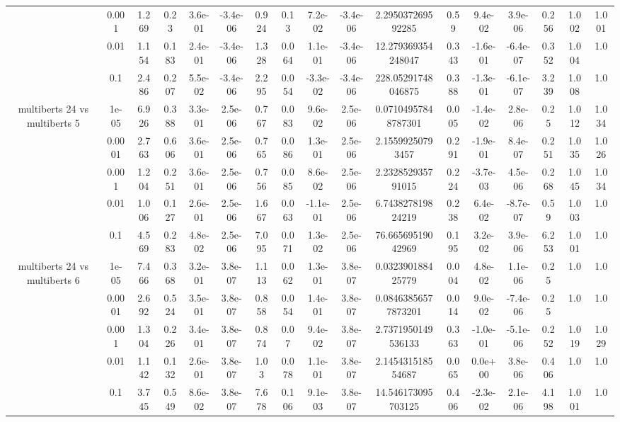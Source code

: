 \begin{tabular}{|c|c|c|c|c|c|c|c|c|c|c|c|c|c|c|c|c|}
 & 0.001 & 1.269 & 0.23 & 3.6e-01 & -3.4e-06 & 0.924 & 0.13 & 7.2e-02 & -3.4e-06 & 2.295037269592285 & 0.59 & 9.4e-02 & 3.9e-06 & 0.256 & 1.002 & 1.001 \\
 & 0.01 & 1.154 & 0.183 & 2.4e-01 & -3.4e-06 & 1.328 & 0.064 & 1.1e-01 & -3.4e-06 & 12.279369354248047 & 0.343 & -1.6e-01 & -6.4e-07 & 0.352 & 1.004 & 1.0 \\
 & 0.1 & 2.486 & 0.207 & 5.5e-02 & -3.4e-06 & 2.295 & 0.054 & -3.3e-02 & -3.4e-06 & 228.05291748046875 & 0.388 & -1.3e-01 & -6.1e-07 & 3.239 & 1.008 & 1.0 \\
\hline
\multirow{5}{*}{multiberts 24 vs multiberts 5} & 1e-05 & 6.926 & 0.388 & 3.3e-01 & 2.5e-06 & 0.767 & 0.083 & 9.6e-02 & 2.5e-06 & 0.07104957848787301 & 0.005 & -1.4e-02 & 2.8e-06 & 0.25 & 1.012 & 1.034 \\
 & 0.0001 & 2.763 & 0.606 & 3.6e-01 & 2.5e-06 & 0.765 & 0.086 & 1.3e-01 & 2.5e-06 & 2.15599250793457 & 0.291 & -1.9e-01 & 8.4e-07 & 0.251 & 1.035 & 1.026 \\
 & 0.001 & 1.204 & 0.251 & 3.6e-01 & 2.5e-06 & 0.756 & 0.085 & 8.6e-02 & 2.5e-06 & 2.232852935791015 & 0.224 & -3.7e-03 & 4.5e-06 & 0.268 & 1.045 & 1.034 \\
 & 0.01 & 1.006 & 0.127 & 2.6e-01 & 2.5e-06 & 1.667 & 0.063 & -1.1e-01 & 2.5e-06 & 6.743827819824219 & 0.238 & 6.4e-02 & -8.7e-07 & 0.59 & 1.003 & 1.0 \\
 & 0.1 & 4.569 & 0.283 & 4.8e-02 & 2.5e-06 & 7.095 & 0.071 & 1.3e-02 & 2.5e-06 & 76.66569519042969 & 0.195 & 3.2e-02 & 3.9e-06 & 6.253 & 1.001 & 1.0 \\
\hline
\multirow{5}{*}{multiberts 24 vs multiberts 6} & 1e-05 & 7.466 & 0.368 & 3.2e-01 & 3.8e-07 & 1.113 & 0.062 & 1.3e-01 & 3.8e-07 & 0.032390188425779 & 0.004 & 4.8e-02 & 1.1e-06 & 0.25 & 1.0 & 1.0 \\
 & 0.0001 & 2.692 & 0.524 & 3.5e-01 & 3.8e-07 & 0.858 & 0.054 & 1.4e-01 & 3.8e-07 & 0.08463856577873201 & 0.014 & 9.0e-02 & -7.4e-06 & 0.25 & 1.0 & 1.0 \\
 & 0.001 & 1.304 & 0.226 & 3.4e-01 & 3.8e-07 & 0.874 & 0.07 & 9.4e-02 & 3.8e-07 & 2.7371950149536133 & 0.363 & -1.0e-01 & -5.1e-06 & 0.252 & 1.019 & 1.029 \\
 & 0.01 & 1.142 & 0.132 & 2.6e-01 & 3.8e-07 & 1.03 & 0.078 & 1.1e-01 & 3.8e-07 & 2.145431518554687 & 0.065 & 0.0e+00 & 3.8e-06 & 0.406 & 1.0 & 1.0 \\
 & 0.1 & 3.745 & 0.549 & 8.6e-02 & 3.8e-07 & 7.678 & 0.106 & 9.1e-03 & 3.8e-07 & 14.546173095703125 & 0.406 & -2.3e-02 & 2.1e-06 & 4.198 & 1.001 & 1.0 \\

\end{tabular}
